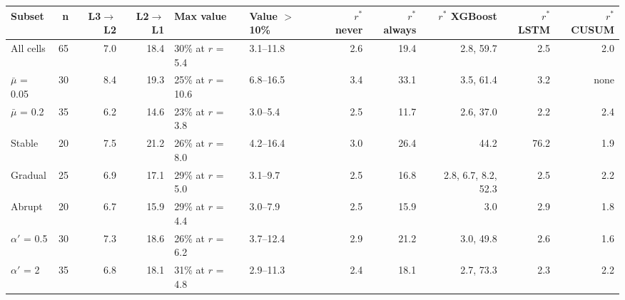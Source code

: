 \noindent\begin{minipage}{\linewidth}
\label{tab:S21_1}
\centering\scriptsize
\begin{tabular}{lrrrllrrrrr}
\toprule
Subset & n & L3$\to$L2 & L2$\to$L1 & Max value & Value $>$ 10\% & $r^{*}$ never & $r^{*}$ always & $r^{*}$ XGBoost & $r^{*}$ LSTM & $r^{*}$ CUSUM \\ \midrule
All cells & 65 & 7.0 & 18.4 & 30\% at $r$ = 5.4 & 3.1–11.8 & 2.6 & 19.4 & 2.8, 59.7 & 2.5 & 2.0 \\
$\bar{\mu}$ = 0.05 & 30 & 8.4 & 19.3 & 25\% at $r$ = 10.6 & 6.8–16.5 & 3.4 & 33.1 & 3.5, 61.4 & 3.2 & none \\
$\bar{\mu}$ = 0.2 & 35 & 6.2 & 14.6 & 23\% at $r$ = 3.8 & 3.0–5.4 & 2.5 & 11.7 & 2.6, 37.0 & 2.2 & 2.4 \\
Stable & 20 & 7.5 & 21.2 & 26\% at $r$ = 8.0 & 4.2–16.4 & 3.0 & 26.4 & 44.2 & 76.2 & 1.9 \\
Gradual & 25 & 6.9 & 17.1 & 29\% at $r$ = 5.0 & 3.1–9.7 & 2.5 & 16.8 & 2.8, 6.7, 8.2, 52.3 & 2.5 & 2.2 \\
Abrupt & 20 & 6.7 & 15.9 & 29\% at $r$ = 4.4 & 3.0–7.9 & 2.5 & 15.9 & 3.0 & 2.9 & 1.8 \\
$\alpha'$ = 0.5 & 30 & 7.3 & 18.6 & 26\% at $r$ = 6.2 & 3.7–12.4 & 2.9 & 21.2 & 3.0, 49.8 & 2.6 & 1.6 \\
$\alpha'$ = 2 & 35 & 6.8 & 18.1 & 31\% at $r$ = 4.8 & 2.9–11.3 & 2.4 & 18.1 & 2.7, 73.3 & 2.3 & 2.2 \\
\bottomrule
\end{tabular}
\end{minipage}
\vspace{14pt}

